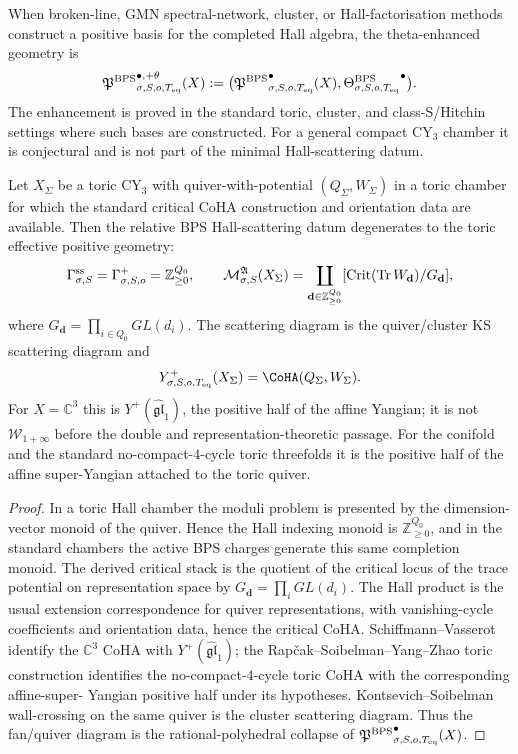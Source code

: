 \begin{definition}
\label{def:theta-enhanced-effective-bps}
When broken-line, GMN spectral-network, cluster, or Hall-factorisation
methods construct a positive basis for the completed Hall algebra, the
theta-enhanced geometry is
\[
 {\mathfrak{P}^{\mathrm{BPS}}}^{\bullet,+\theta}_{\sigma,S,o,T_{\mathrm{eq}}}(X)
 :=
 \bigl(
 {\mathfrak{P}^{\mathrm{BPS}}}^{\bullet}_{\sigma,S,o,T_{\mathrm{eq}}}(X),
 {\Theta^{\mathrm{BPS}}_{\sigma,S,o,T_{\mathrm{eq}}}}^{\bullet}
 \bigr).
\]
The enhancement is proved in the standard toric, cluster, and
class-S/Hitchin settings where such bases are constructed. For a
general compact CY$_3$ chamber it is conjectural and is not part of the
minimal Hall-scattering datum.
\end{definition}

\begin{proposition}
\label{prop:toric-effective-geometry-terminal-degeneration}
Let $X_{\Sigma}$ be a toric CY$_3$ with quiver-with-potential
$(Q_{\Sigma},W_{\Sigma})$ in a toric chamber for which the standard
critical CoHA construction and orientation data are available. Then the
relative BPS Hall-scattering datum degenerates to the toric effective
positive geometry:
\[
 \Gamma^{\mathrm{ss}}_{\sigma,S}=\Gamma^{+}_{\sigma,S,o}=\mathbb{Z}^{Q_0}_{\geq 0},
 \qquad
 \mathcal{M}^{\mathfrak A}_{\sigma,S}(X_{\Sigma})
 =
 \coprod_{\mathbf d\in\mathbb{Z}^{Q_0}_{\geq 0}}
 [\mathrm{Crit}(\mathrm{Tr}\,W_{\mathbf d})/G_{\mathbf d}],
\]
where $G_{\mathbf d}=\prod_{i\in Q_0}GL(d_i)$. The scattering diagram
is the quiver/cluster KS scattering diagram and
\[
 Y^+_{\sigma,S,o,\Teq}(X_{\Sigma})
 =
 \CoHA(Q_{\Sigma},W_{\Sigma}).
\]
For $X=\mathbb{C}^3$ this is
$Y^+(\widehat{\mathfrak{gl}}_1)$, the positive half of the affine
Yangian; it is not $\mathcal W_{1+\infty}$ before the double and
representation-theoretic passage. For the conifold and the standard
no-compact-$4$-cycle toric threefolds it is the positive half of the
affine super-Yangian attached to the toric quiver.
\end{proposition}

\begin{proof}
In a toric Hall chamber the moduli problem is presented by the
dimension-vector monoid of the quiver. Hence the Hall indexing monoid is
$\mathbb{Z}^{Q_0}_{\geq0}$, and in the standard chambers the active BPS
charges generate this same completion monoid. The derived critical stack
is the quotient of the critical locus of the trace potential on
representation space by $G_{\mathbf d}=\prod_i GL(d_i)$. The Hall
product is the usual extension correspondence for quiver
representations, with vanishing-cycle coefficients and orientation data,
hence the critical CoHA\@. Schiffmann--Vasserot identify the
$\mathbb{C}^3$ CoHA with $Y^+(\widehat{\mathfrak{gl}}_1)$; the
Rap\v{c}ak--Soibelman--Yang--Zhao toric construction identifies the
no-compact-$4$-cycle toric CoHA with the corresponding affine-super-
Yangian positive half under its hypotheses. Kontsevich--Soibelman
wall-crossing on the same quiver is the cluster scattering diagram. Thus
the fan/quiver diagram is the rational-polyhedral collapse of
${\mathfrak{P}^{\mathrm{BPS}}}^{\bullet}_{\sigma,S,o,T_{\mathrm{eq}}}(X)$.
\end{proof}

